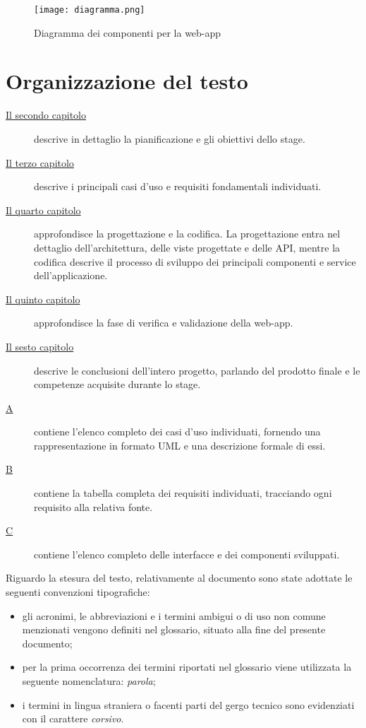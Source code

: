 \begin{figure}[H]
    \centering
    \texttt{[image: diagramma.png]}
    \caption{Diagramma dei componenti per la web-app}
\end{figure}


\section{Organizzazione del testo}

\begin{description}
    \item[{\hyperref[cap:il progetto di stage]{Il secondo capitolo}}] descrive in dettaglio la pianificazione e gli obiettivi dello stage.
    
    \item[{\hyperref[cap:analisi dei requisiti]{Il terzo capitolo}}] descrive i principali casi d'uso e requisiti fondamentali individuati.
    
    \item[{\hyperref[cap:progettazione e codifica]{Il quarto capitolo}}] approfondisce la progettazione e la codifica. La progettazione entra nel dettaglio dell'architettura, delle viste progettate e delle API, mentre la codifica descrive il processo di sviluppo dei principali componenti e service dell'applicazione.
    
    \item[{\hyperref[cap:verifica]{Il quinto capitolo}}] approfondisce la fase di verifica e validazione della web-app.
    
    \item[{\hyperref[cap:conclusioni]{Il sesto capitolo}}] descrive le conclusioni dell'intero progetto, parlando del prodotto finale e le competenze acquisite durante lo stage.
    \item[{\hyperref[cap:appendice a]{A}}] contiene l'elenco completo dei casi d'uso individuati, fornendo una rappresentazione in formato UML e una descrizione formale di essi.
    \item[{\hyperref[cap:appendice b]{B}}] contiene la tabella completa dei requisiti individuati, tracciando ogni requisito alla relativa fonte.
    \item[{\hyperref[cap:appendice c]{C}}] contiene l'elenco completo delle interfacce e dei componenti sviluppati.
\end{description}
Riguardo la stesura del testo, relativamente al documento sono state adottate le seguenti convenzioni tipografiche:
\begin{itemize}
	\item gli acronimi, le abbreviazioni e i termini ambigui o di uso non comune menzionati vengono definiti nel glossario, situato alla fine del presente documento;
	\item per la prima occorrenza dei termini riportati nel glossario viene utilizzata la seguente nomenclatura: \emph{parola}\glsfirstoccur;
	\item i termini in lingua straniera o facenti parti del gergo tecnico sono evidenziati con il carattere \emph{corsivo}.
\end{itemize}